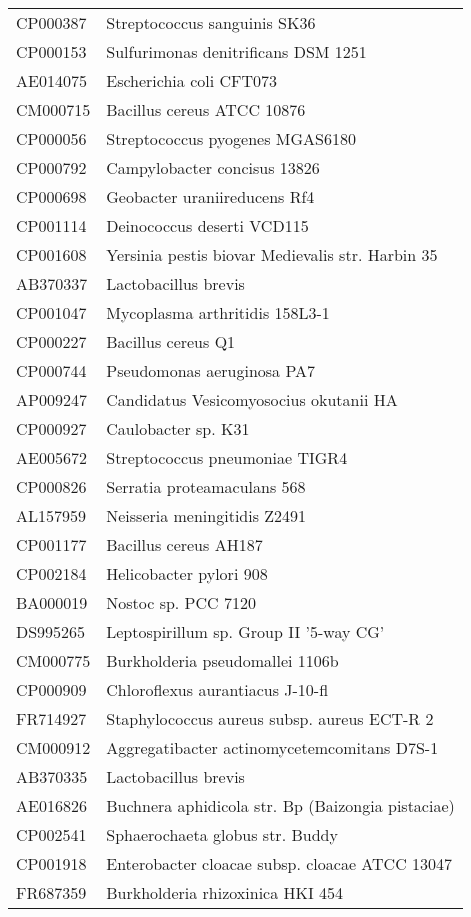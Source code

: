 \begin{longtable}{ll}
CP000387 & Streptococcus sanguinis SK36\\
CP000153 & Sulfurimonas denitrificans DSM 1251\\
AE014075 & Escherichia coli CFT073\\
CM000715 & Bacillus cereus ATCC 10876\\
CP000056 & Streptococcus pyogenes MGAS6180\\
CP000792 & Campylobacter concisus 13826\\
CP000698 & Geobacter uraniireducens Rf4\\
CP001114 & Deinococcus deserti VCD115\\
CP001608 & Yersinia pestis biovar Medievalis str. Harbin 35\\
AB370337 & Lactobacillus brevis\\
CP001047 & Mycoplasma arthritidis 158L3-1\\
CP000227 & Bacillus cereus Q1\\
CP000744 & Pseudomonas aeruginosa PA7\\
AP009247 & Candidatus Vesicomyosocius okutanii HA\\
CP000927 & Caulobacter sp. K31\\
AE005672 & Streptococcus pneumoniae TIGR4\\
CP000826 & Serratia proteamaculans 568\\
AL157959 & Neisseria meningitidis Z2491\\
CP001177 & Bacillus cereus AH187\\
CP002184 & Helicobacter pylori 908\\
BA000019 & Nostoc sp. PCC 7120\\
DS995265 & Leptospirillum sp. Group II '5-way CG'\\
CM000775 & Burkholderia pseudomallei 1106b\\
CP000909 & Chloroflexus aurantiacus J-10-fl\\
FR714927 & Staphylococcus aureus subsp. aureus ECT-R 2\\
CM000912 & Aggregatibacter actinomycetemcomitans D7S-1\\
AB370335 & Lactobacillus brevis\\
AE016826 & Buchnera aphidicola str. Bp (Baizongia pistaciae)\\
CP002541 & Sphaerochaeta globus str. Buddy\\
CP001918 & Enterobacter cloacae subsp. cloacae ATCC 13047\\
FR687359 & Burkholderia rhizoxinica HKI 454\\

\end{longtable}
